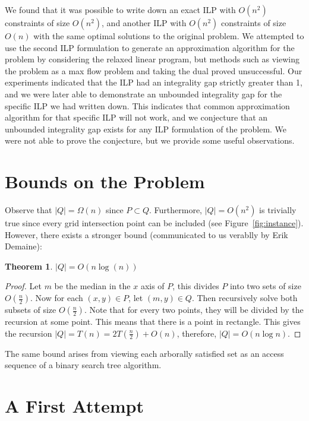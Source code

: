 \documentclass[11pt]{article}
\newtheorem{theorem}{Theorem}
\begin{document}
We found that it was possible to write down an exact ILP with $O(n^2)$ constraints of size $O(n^2)$, and another ILP with $O(n^2)$ constraints of size $O(n)$ with the same optimal solutions to the original problem. We attempted to use the second ILP formulation to generate an approximation algorithm for the problem by considering the relaxed linear program, but methods such as viewing the problem as a max flow problem and taking the dual proved unsuccessful. Our experiments indicated that the ILP had an integrality gap strictly greater than 1, and we were later able to demonstrate an unbounded integrality gap for the specific ILP we had written down. This indicates that common approximation algorithm for that specific ILP will not work, and we conjecture that an unbounded integrality gap exists for any ILP formulation of the problem. We were not able to prove the conjecture, but we provide some useful observations.

\section{Bounds on the Problem}

Observe that $|Q| = \Omega(n)$ since $P \subset Q$. Furthermore, $|Q| = O(n^2)$ is trivially true since every grid intersection point can be included (see Figure~\ref{fig:instance}). However, there exists a stronger bound (communicated to us verablly by Erik Demaine):

\begin{theorem} $|Q| = O(n\log(n))$
\end{theorem}
\begin{proof}
Let $m$ be the median in the $x$ axis of $P$, this divides $P$ into two sets of size $O(\frac{n}{2})$. Now for each $(x,y) \in P$, let $(m, y) \in Q$. Then recursively solve both subsets of size $O(\frac{n}{2})$. Note that for every two points, they will be divided by the recursion at some point. This means that there is a point in rectangle. This gives the recursion $|Q| = T(n) = 2T(\frac{n}{2}) + O(n)$, therefore, $|Q| = O(n \log n)$. 
\end{proof}

The same bound arises from viewing each arborally satisfied set as an access sequence of a binary search tree algorithm. \cite{geometryBST}

\section{A First Attempt}
\end{document}
